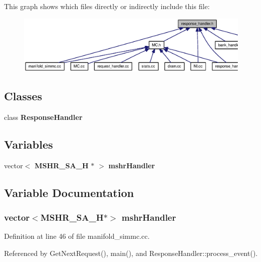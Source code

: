 This graph shows which files directly or indirectly include this file:\nopagebreak
\begin{figure}[H]
\begin{center}
\leavevmode
\includegraphics[width=374pt]{response__handler_8h__dep__incl}
\end{center}
\end{figure}
\subsection*{Classes}
\begin{CompactItemize}
\item 
class {\bf ResponseHandler}
\end{CompactItemize}
\subsection*{Variables}
\begin{CompactItemize}
\item 
vector$<$ {\bf MSHR\_\-SA\_\-H} $\ast$ $>$ {\bf mshrHandler}
\end{CompactItemize}


\subsection{Variable Documentation}
\subsubsection[{mshrHandler}]{\setlength{\rightskip}{0pt plus 5cm}vector$<${\bf MSHR\_\-SA\_\-H}$\ast$$>$ {\bf mshrHandler}}\label{response__handler_8h_1fc79726402dfb84d1bfc19aaf5dc776}




Definition at line 46 of file manifold\_\-simmc.cc.

Referenced by GetNextRequest(), main(), and ResponseHandler::process\_\-event().